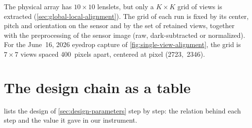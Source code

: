 The physical array has $10\times10$ lenslets, but only a $K\times K$ grid of views is extracted (\cref{sec:global-local-alignment}). The grid of each run is fixed by its center, pitch and orientation on the sensor and by the set of retained views, together with the preprocessing of the sensor image (raw, dark-subtracted or normalized). For the June~16, 2026 eyedrop capture of \cref{fig:single-view-alignment}, the grid is $7\times7$ views spaced 400~pixels apart, centered at pixel (2723,~2346).

\section{The design chain as a table}
\label{sec:app-design-table}

 lists the design of \cref{sec:design-parameters} step by step: the relation behind each step and the value it gave in our instrument.

